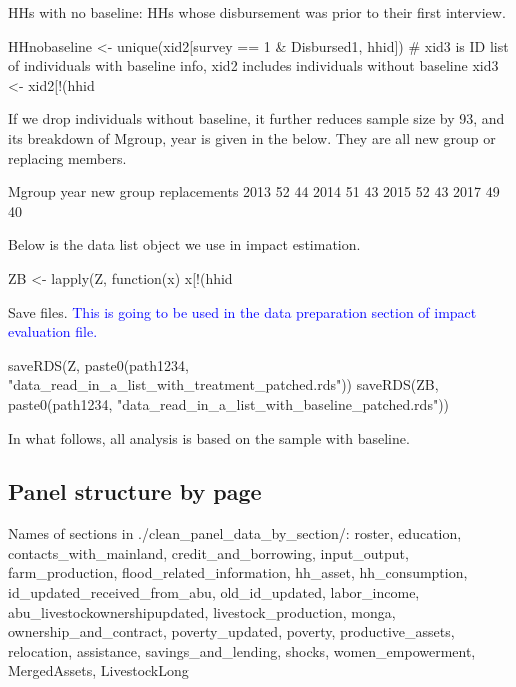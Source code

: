 HHs with no baseline: HHs whose disbursement was prior to their first interview.
\begin{Schunk}
\begin{Sinput}
HHnobaseline <- unique(xid2[survey == 1 & Disbursed1, hhid])
# xid3 is ID list of individuals with baseline info, xid2 includes individuals without baseline
xid3 <- xid2[!(hhid %in% HHnobaseline), ]
\end{Sinput}
\end{Schunk}
If we drop individuals without baseline, it further reduces sample size by 93, and its breakdown of \textsf{Mgroup, year} is given in the below. They are all new group or replacing members. 
\begin{Schunk}
\begin{Soutput}
      Mgroup
year   new group replacements
  2013        52           44
  2014        51           43
  2015        52           43
  2017        49           40
\end{Soutput}
\end{Schunk}
Below is the data list object we use in impact estimation.
\begin{Schunk}
\begin{Sinput}
ZB <- lapply(Z, function(x) x[!(hhid %in% HHnobaseline), ])
\end{Sinput}
\end{Schunk}
Save files. \textcolor{blue}{This is going to be used in the data preparation section of impact evaluation file.}
\begin{Schunk}
\begin{Sinput}
saveRDS(Z, paste0(path1234, "data_read_in_a_list_with_treatment_patched.rds"))
saveRDS(ZB, paste0(path1234, "data_read_in_a_list_with_baseline_patched.rds"))
\end{Sinput}
\end{Schunk}
In what follows, all analysis is based on the sample with baseline.


\subsection{Panel structure by page}


Names of sections in \textsf{\footnotesize ./clean\_panel\_data\_by\_section/}: \textsf{\footnotesize roster, education, contacts\_with\_mainland, credit\_and\_borrowing, input\_output, farm\_production, flood\_related\_information, hh\_asset, hh\_consumption, id\_updated\_received\_from\_abu, old\_id\_updated, labor\_income, abu\_livestockownershipupdated, livestock\_production, monga, ownership\_and\_contract, poverty\_updated, poverty, productive\_assets, relocation, assistance, savings\_and\_lending, shocks, women\_empowerment, MergedAssets, LivestockLong}

